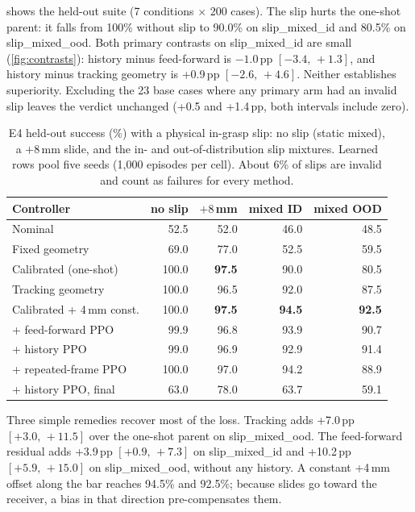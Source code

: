 \documentclass[conference,letterpaper]{IEEEtran}
\newcommand{\pp}{\,pp}
\newcommand{\ci}[2]{\mbox{$[#1,\,#2]$}}
\newcommand{\cond}[1]{\textsf{\small #1}}
\begin{document}
 shows the held-out suite (7 conditions $\times$ 200 cases). The slip hurts the one-shot parent: it
falls from 100\% without slip to 90.0\% on \cond{slip\_mixed\_id} and 80.5\% on \cond{slip\_mixed\_ood}. Both
primary contrasts on \cond{slip\_mixed\_id} are small (\cref{fig:contrasts}): history minus feed-forward is
$-1.0$\pp{} \ci{-3.4}{+1.3}, and history minus tracking geometry is +0.9\pp{} \ci{-2.6}{+4.6}. Neither establishes
superiority. Excluding the 23 base cases where any primary arm had an invalid slip leaves the verdict unchanged
(+0.5 and +1.4\pp, both intervals include zero).

\begin{table}[t]
\centering
\caption{E4 held-out success (\%) with a physical in-grasp slip: no slip (static mixed), a $+8$\,mm
slide, and the in- and out-of-distribution slip mixtures. Learned rows pool five seeds
(1,000 episodes per cell). About 6\% of slips are invalid and count as failures for every method.}
\label{tab:e4}
\setlength{\tabcolsep}{4.5pt}
\begin{tabular}{@{}lrrrr@{}}
\toprule
Controller & no slip & $+8$\,mm & mixed ID & mixed OOD \\
\midrule
Nominal & 52.5 & 52.0 & 46.0 & 48.5 \\
Fixed geometry & 69.0 & 77.0 & 52.5 & 59.5 \\
Calibrated (one-shot) & 100.0 & \textbf{97.5} & 90.0 & 80.5 \\
Tracking geometry & 100.0 & 96.5 & 92.0 & 87.5 \\
Calibrated + 4\,mm const. & 100.0 & \textbf{97.5} & \textbf{94.5} & \textbf{92.5} \\
\midrule
\quad + feed-forward PPO & 99.9 & 96.8 & 93.9 & 90.7 \\
\quad + history PPO & 99.0 & 96.9 & 92.9 & 91.4 \\
\quad + repeated-frame PPO & 100.0 & 97.0 & 94.2 & 88.9 \\
\quad + history PPO, final & 63.0 & 78.0 & 63.7 & 59.1 \\
\bottomrule
\end{tabular}
\end{table}

Three simple remedies recover most of the loss. Tracking adds +7.0\pp{} \ci{+3.0}{+11.5} over the one-shot parent on
\cond{slip\_mixed\_ood}. The feed-forward residual adds +3.9\pp{} \ci{+0.9}{+7.3} on \cond{slip\_mixed\_id} and
+10.2\pp{} \ci{+5.9}{+15.0} on \cond{slip\_mixed\_ood}, without any history. A constant +4\,mm offset along the bar
reaches 94.5\% and 92.5\%; because slides go toward the receiver, a bias in that direction pre-compensates them.
\end{document}
